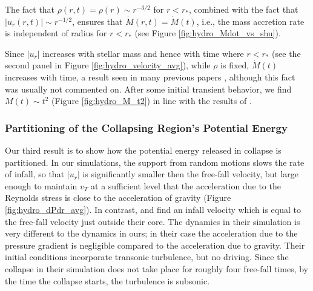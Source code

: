 \documentclass[../dissertation.tex]{subfiles}
\begin{document}
The fact that $\rho(r,t)=\rho(r)\sim r^{-3/2}$ for $r<r_*$, combined
with the fact that $|u_r(r,t)|\sim r^{-1/2}$,  ensures that $\dot
M(r,t)=\dot M(t)$, i.e., the mass accretion rate is independent of
radius for $r<r_*$ (see Figure
\ref{fig:hydro_Mdot_vs_shu}). 

Since $|u_r|$ increases with stellar mass and hence with time where $r<r_*$ 
(see the second panel in Figure \ref{fig:hydro_velocity_avg}), while $\rho$ is fixed, 
$\dot M(t)$ increases with time, a result seen in many previous papers \citep{2011ApJ...730...40P,2012MNRAS.419.3115B,2012ApJ...754...71K,
2012ApJ...761..156F,2014MNRAS.439.3420M}, 
although this fact was usually not commented on. After some initial transient 
behavior, we find $M(t)\sim t^2$ (Figure \ref{fig:hydro_M_t2}) in line with the results of \citet{2015ApJ...800...49L}.

\subsubsection{Partitioning of the Collapsing Region's Potential Energy}
Our third result is to show how the potential energy released in collapse is partitioned.
In our simulations,
the support from random motions slows the rate of infall, so that $|u_r|$ is significantly smaller
then the free-fall velocity, but large enough to maintain $v_T$ at a sufficient level
that the acceleration due to the Reynolds stress is close to the acceleration of
gravity (Figure \ref{fig:hydro_dPdr_avg}).
In contrast, \citet{2010ApJ...721L.134S} and \citet{2011ApJ...731...62F} find an infall velocity which is equal to the free-fall velocity just outside their core. The dynamics in their simulation is very different to the dynamics in ours; in their case the acceleration due to the pressure gradient is negligible compared to the acceleration due to gravity. Their initial conditions incorporate transonic turbulence, but no driving. Since the collapse in their simulation does not take place for roughly four free-fall times, by the time the collapse starts, the turbulence is subsonic.
\end{document}
